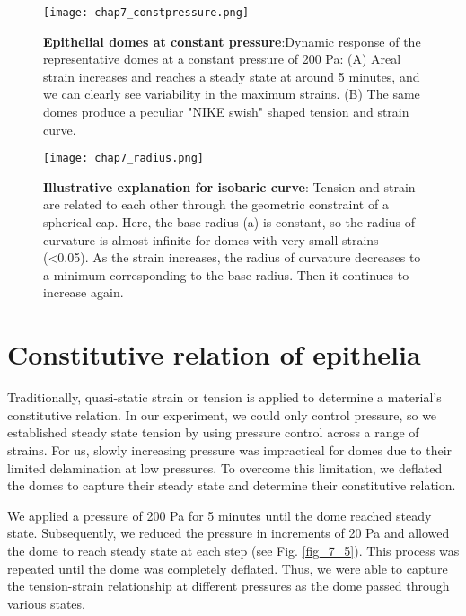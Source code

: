 \begin{figure}[t]
	\centering
	\texttt{[image: chap7\_constpressure.png]}
	\caption{\label{fig_7_3} \textbf{Epithelial domes at constant pressure}:Dynamic response of the representative domes at a constant pressure of 200 Pa: (A) Areal strain increases and reaches a steady state at around 5 minutes, and we can clearly see variability in the maximum strains. (B) The same domes produce a peculiar "NIKE swish" shaped tension and strain curve.
	}
\end{figure}

\begin{figure}
	\centering
	\texttt{[image: chap7\_radius.png]}
	\caption{\label{fig_7_4} \textbf{Illustrative explanation for isobaric curve}: Tension and strain are related to each other through the geometric constraint of a spherical cap. Here, the base radius (a) is constant, so the radius of curvature is almost infinite for domes with very small strains (<0.05). As the strain increases, the radius of curvature decreases to a minimum corresponding to the base radius. Then it continues to increase again.	
	}
\end{figure}



\hypertarget{constitutive-relation-of-epithelia}{%
	\section{Constitutive relation of
		epithelia}\label{constitutive-relation-of-epithelia}}

Traditionally, quasi-static strain or tension is applied to determine a material's constitutive relation. In our experiment, we could only control pressure, so we established steady state tension by using pressure control across a range of strains. For us, slowly increasing pressure was impractical for domes due to their limited delamination at low pressures. To overcome this limitation, we deflated the domes to capture their steady state and determine their constitutive relation.

We applied a pressure of 200 Pa for 5 minutes until the dome reached steady state. Subsequently, we reduced the pressure in increments of 20 Pa and allowed the dome to reach steady state at each step (see Fig. \ref{fig_7_5}). This process was repeated until the dome was completely deflated. Thus, we were able to capture the tension-strain relationship at different pressures as the dome passed through various states.

